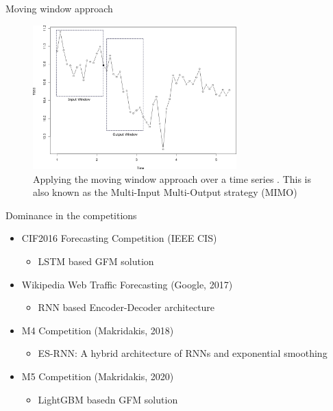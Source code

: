 \documentclass{beamer}
\begin{document}
  \begin{frame}{Moving window approach}
  	 \begin{figure}[htb]
  \begin{center}
    \includegraphics[width=0.7\textwidth]{images/window_final}
    \caption{\scriptsize Applying the moving window approach over a time series . This is also known as the Multi-Input Multi-Output strategy (MIMO)}
  \label{fig:network}
  \end{center}
\end{figure}
  \end{frame}
  

\begin{frame}{Dominance in the competitions}
   	\begin{itemize}
    			\item  CIF2016 Forecasting Competition (IEEE CIS)
  				\begin{itemize}\color{blue}
						\item LSTM based GFM solution~\cite{Smyl2016-ee}
	  			\end{itemize}
   		 	\item  Wikipedia Web Traffic Forecasting (Google, 2017)
  				\begin{itemize}\color{blue}
						\item RNN based Encoder-Decoder architecture~\cite{Suilin2018-tc}
	 			 \end{itemize}
	   		\item  M4 Competition (Makridakis, 2018)
	  			 \begin{itemize}\color{blue}
					\item ES-RNN: A hybrid architecture of RNNs and exponential smoothing~\cite{Smyl2019-cb}
	 		 	\end{itemize}
	 		\item  M5 Competition (Makridakis, 2020)
	  			 \begin{itemize}\color{blue}
					\item LightGBM basedn GFM solution ~\cite{Makridakis2021-ro}
	 		 	\end{itemize}
 	\end{itemize}
 \end{frame}
 
\end{document}
